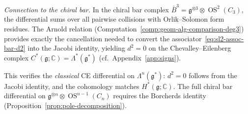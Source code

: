 \begin{computation}
\emph{Connection to the chiral bar.}
In the chiral bar complex
$\bar{B}^3 = \mathfrak{g}^{\otimes 3} \otimes \operatorname{OS}^2(C_3)$,
the differential sums over all pairwise collisions with
Orlik--Solomon form residues.  The Arnold relation
(Computation~\ref{comp:geom-alg-comparison-deg3}) provides
exactly the cancellation needed to convert the
associator~\eqref{eq:sl2-assoc-bar-d2} into the Jacobi identity,
yielding $d^2 = 0$ on the Chevalley--Eilenberg complex
$C^*(\mathfrak{g}; \mathbb{C}) = \Lambda^*(\mathfrak{g}^*)$
(cf.~Appendix~\ref{app:signs}).

This verifies the \emph{classical} CE differential on
$\Lambda^n(\mathfrak{g}^*)$: $d^2 = 0$ follows from the Jacobi identity,
and the cohomology matches $H^*(\mathfrak{g}; \mathbb{C})$.
The full chiral bar differential on
$\mathfrak{g}^{\otimes n} \otimes \operatorname{OS}^{n-1}(C_n)$
requires the Borcherds identity
(Proposition~\ref{prop:pole-decomposition}).
\end{computation}

